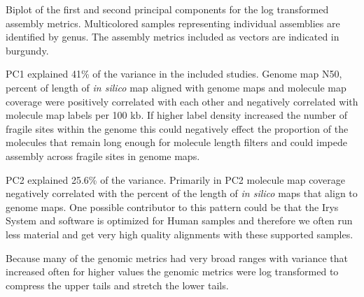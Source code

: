 Biplot of the first and second principal components for the log transformed assembly metrics. Multicolored samples representing individual assemblies are identified by genus. The assembly metrics included as vectors are indicated in burgundy. 

PC1 explained 41\% of the variance in the included studies. Genome map N50, percent of length of \textit{in silico} map aligned with genome maps and molecule map coverage were positively  correlated with each other and negatively correlated with molecule map labels per 100 kb. If higher label density increased the number of fragile sites within the genome this could  negatively effect the proportion of the molecules that remain long enough for molecule length filters and could impede assembly across fragile sites in genome maps. 

PC2 explained 25.6\% of the variance. Primarily in PC2 molecule map coverage negatively correlated with the percent of the length of \textit{in silico} maps that align to genome maps. One possible contributor to this pattern could be that the Irys System and software is optimized for Human samples and therefore we often run less material and get very high quality alignments with these supported samples.

Because many of the genomic metrics had very broad ranges with variance that increased often for higher values the genomic metrics were log transformed to compress the upper tails and stretch the lower tails.